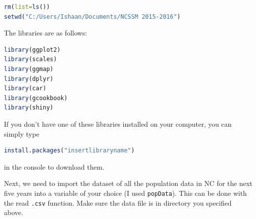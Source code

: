 \begin{lstlisting}[language = R]
rm(list=ls())
setwd("C:/Users/Ishaan/Documents/NCSSM 2015-2016")
\end{lstlisting}

\noindent The libraries are as follows:

\begin{lstlisting}[language = R]
library(ggplot2)
library(scales)
library(ggmap)
library(dplyr)
library(car)
library(gcookbook)
library(shiny)
\end{lstlisting}


\noindent If you don't have one of these libraries installed on your computer, you can simply type 
\begin{lstlisting}[language = R]
install.packages("insertlibraryname") 
\end{lstlisting}
in the console to download them. 

\noindent Next, we need to import the dataset of all the population data in NC for the next five years into a variable of your choice (I used \texttt{popData}).
This can be done with the read \texttt{.csv} function.
Make sure the data file is in directory you specified above. 

